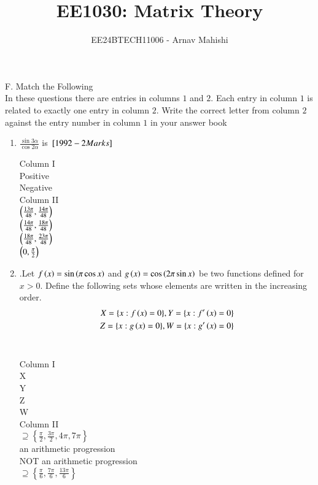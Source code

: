 \documentclass[journal,12pt,twocolumn]{IEEEtran}
\theoremstyle{remark}
\begin{document}

\vspace{3cm}

\title{EE1030: Matrix Theory}
\author{EE24BTECH11006 - Arnav Mahishi}
\maketitle
\newpage
\bigskip

\renewcommand{\thefigure}{\theenumi}
\renewcommand{\thetable}{\theenumi}
F. Match the Following \\
In these questions there are entries in columns $1$ and $2$. Each entry in column $1$ is related to exactly one entry in column $2$. Write the correct letter from column $2$ against the entry number in column $1$ in your answer book
\begin{enumerate}
 \item $\frac{\sin3\alpha}{\cos2\alpha}$ \; is $\hfill{\sbrak{1992-2 Marks}}$
\\
\begin{multicols}{2}
Column I
\\
 Positive
\\
 Negative
\columnbreak
\\
Column II
\\
 $\left(\frac{13\pi}{48},\frac{14\pi}{48}\right)$
\\
 $\left(\frac{14\pi}{48},\frac{18\pi}{48}\right)$
\\
 $\left(\frac{18\pi}{48},\frac{23\pi}{48}\right)$
\\
 $\left(0,\frac{\pi}{2}\right)$


\end{multicols}


\item.Let $f\left(x\right) = \sin\left(\pi \cos x\right)$ and $g\left(x\right) = \cos\left(2\pi \sin x\right)$ be two functions defined for $x > 0$. Define the following sets whose elements are written in the increasing order. \hfill{}
\begin{align}
X=\{x:f\left(x\right)=0\},Y=\{x:f'\left(x\right)=0\}\\
Z=\{x:g\left(x\right)=0\}, W=\{x:g'\left(x\right)=0\}
\end{align}
\\
\begin{multicols}{2}
Column I
\\
 X
\\
 Y
\\
 Z
\\
 W
\columnbreak
\\
Column II
\\
 $\supseteq \left\{ \frac{\pi}{2}, \frac{3\pi}{2}, 4\pi, 7\pi \right\}$
\\
an arithmetic progression
\\
NOT an arithmetic progression
\\
$\supseteq\left\{\frac{\pi}{6},\frac{7\pi}{6},\frac{13\pi}{6}\right\}$



\end{multicols}
\end{enumerate}
\end{document}

